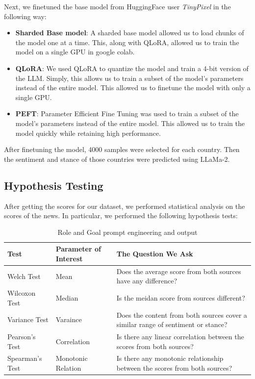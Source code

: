 \documentclass{article}
\theoremstyle{mytheoremstyle}
\theoremstyle{mytheoremstyle}
\theoremstyle{myproblemstyle}
\begin{document}
    
    Next, we finetuned the base model from HuggingFace user \emph{TinyPixel} in the following way:

    \begin{itemize}
        \item \textbf{Sharded Base model}: A sharded base model allowed us to load chunks of the model one at a time. This, along with QLoRA, allowed us to train the model on a single GPU in google colab.
        \item \textbf{QLoRA}: We used QLoRA to quantize the model and train a 4-bit version of the LLM. Simply, this allows us to train a subset of the model's parameters instead of the entire model. This allowed us to finetune the model with only a single GPU. \cite{dettmers2023qlora}
        \item \textbf{PEFT}: Parameter Efficient Fine Tuning was used to train a subset of the model's parameters instead of the entire model. This allowed us to train the model quickly while retaining high performance.
    \end{itemize}

    After finetuning the model, 4000 samples were selected for each country. Then the sentiment and stance of those countries were predicted using LLaMa-2.

    \subsection{Hypothesis Testing}
    After getting the scores for our dataset, we performed statistical analysis on the scores of the news. In particular, we performed the following hypothesis tests:

    \begin{table}[hp]
        \centering
        \begin{tabular}{ | m{2cm} | m{3cm}| m{8cm} | } 
          \hline
          \textbf{Test} & \textbf{Parameter of Interest} & \textbf{The Question We Ask} \\ 
          \hline
            Welch Test & Mean & Does the average score from both sources have any difference? \\
            \hline
            Wilcoxon Test & Median & Is the meidan score from sources different? \\
            \hline
            Variance Test & Varaince & Does the content from both sources cover a similar range of sentiment or stance? \\
            \hline
            Pearson's Test & Correlation & Is there any linear correlation between the scores from both sources? \\
            \hline
            Spearman's Test & Monotonic Relation & Is there any monotonic relationship between the scores from both sources? \\
            \hline
        \end{tabular}

        \caption[Prompt Engineering]{Role and Goal prompt engineering and output}
        \label{table:prompt_engineering}
    \end{table}
\end{document}
